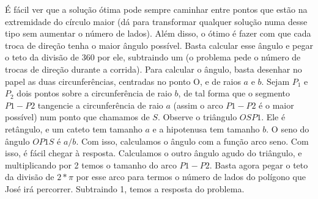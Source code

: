 É fácil ver que a solução ótima pode sempre caminhar entre pontos que estão na extremidade do círculo maior
(dá para transformar qualquer solução numa desse tipo sem aumentar o número de lados). Além disso, o ótimo é
fazer com que cada troca de direção tenha o maior ângulo possível. Basta calcular esse ângulo e pegar o teto
da divisão de 360 por ele, subtraindo um (o problema pede o número de trocas de direção durante a corrida).
Para calcular o ângulo, basta desenhar no papel as duas circunferências, centradas no ponto O, e de raios
$a$ e $b$. Sejam $P_1$ e $P_2$ dois pontos sobre a circunferência de raio $b$, de tal forma que o segmento
$P1 - P2$ tangencie a circunferência de raio $a$ (assim o arco $P1 - P2$ é o maior possível) num ponto que
chamamos de $S$. Observe o triângulo $OSP1$. Ele é retângulo, e um cateto tem tamanho $a$ e a hipotenusa tem
tamanho $b$. O seno do ângulo $OP1S$ é $a / b$. Com isso, calculamos o ângulo com a função arco seno. Com isso,
é fácil chegar à resposta. Calculamos o outro ângulo agudo do triângulo, e multiplicando por 2 temos o tamanho do
arco $P1 - P2$. Basta agora pegar o teto da divisão de $2*\pi$ por esse arco para termos o número de lados do
polígono que José irá percorrer. Subtraindo 1, temos a resposta do problema.
